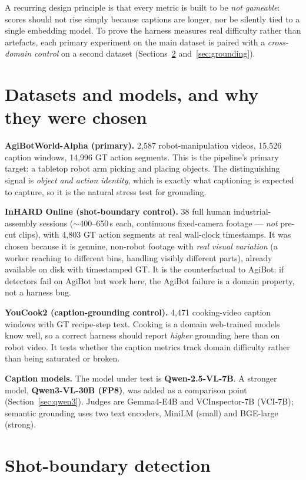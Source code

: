 \documentclass[10pt,letterpaper]{article}
\begin{document}
A recurring design principle is that every metric is built to be \emph{not gameable}: scores
should not rise simply because captions are longer, nor be silently tied to a single embedding
model. To prove the harness measures real difficulty rather than artefacts, each primary
experiment on the main dataset is paired with a \emph{cross-domain control} on a second dataset
(Sections~\ref{sec:sbd} and~\ref{sec:grounding}).

\section{Datasets and models, and why they were chosen}

\textbf{AgiBotWorld-Alpha (primary).} 2{,}587 robot-manipulation videos, 15{,}526 caption
windows, 14{,}996 GT action segments. This is the pipeline's primary target: a tabletop robot
arm picking and placing objects. The distinguishing signal is \emph{object and action
identity}, which is exactly what captioning is expected to capture, so it is the natural stress
test for grounding.

\textbf{InHARD Online (shot-boundary control).} 38 full human industrial-assembly sessions
($\sim$400--650\,s each, continuous fixed-camera footage --- \emph{not} pre-cut clips), with
4{,}803 GT action segments at real wall-clock timestamps. It was chosen because it is genuine,
non-robot footage with \emph{real visual variation} (a worker reaching to different bins,
handling visibly different parts), already available on disk with timestamped GT. It is the
counterfactual to AgiBot: if detectors fail on AgiBot but work here, the AgiBot failure is a
domain property, not a harness bug.

\textbf{YouCook2 (caption-grounding control).} 4{,}471 cooking-video caption windows with GT
recipe-step text. Cooking is a domain web-trained models know well, so a correct harness should
report \emph{higher} grounding here than on robot video. It tests whether the caption metrics
track domain difficulty rather than being saturated or broken.

\textbf{Caption models.} The model under test is \textbf{Qwen-2.5-VL-7B}. A stronger model,
\textbf{Qwen3-VL-30B (FP8)}, was added as a comparison point (Section~\ref{sec:qwen3}). Judges
are Gemma4-E4B and VCInspector-7B (VCI-7B); semantic grounding uses two text encoders, MiniLM
(small) and BGE-large (strong).

\section{Shot-boundary detection}\label{sec:sbd}
\end{document}
